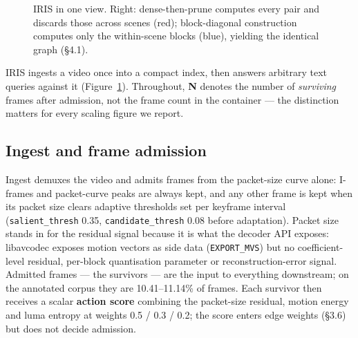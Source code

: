 \documentclass[sigconf,review,anonymous]{acmart}
\begin{document}
\begin{figure}[t]
\caption{IRIS in one view. Right: dense-then-prune computes every pair and discards those across scenes (red); block-diagonal construction computes only the within-scene blocks (blue), yielding the identical graph (\S4.1).}
\label{fig:overview}
\end{figure}

IRIS ingests a video once into a compact index, then answers arbitrary text queries against
it (Figure~\ref{fig:overview}). Throughout, \textbf{N} denotes the number of \emph{surviving} frames after admission, not the frame
count in the container --- the distinction matters for every scaling figure we report.

\subsection{Ingest and frame admission}

Ingest demuxes the video and admits frames from the packet-size curve alone: I-frames and
packet-curve peaks are always kept, and any other frame is kept when its packet size clears
adaptive thresholds set per keyframe interval (\texttt{salient\_thresh} 0.35, \texttt{candidate\_thresh} 0.08
before adaptation). Packet size stands in for the residual signal because it is what the decoder API
exposes: libavcodec exposes motion vectors as side data (\texttt{EXPORT\_MVS}) but no
coefficient-level residual, per-block quantisation parameter or reconstruction-error signal.
Admitted frames --- the survivors --- are the input to everything downstream; on the annotated
corpus they are 10.41--11.14\% of frames. Each survivor then receives a scalar \textbf{action
score} combining the packet-size residual, motion energy and luma entropy at weights 0.5 / 0.3 /
0.2; the score enters edge weights (§3.6) but does not decide admission.
\end{document}
